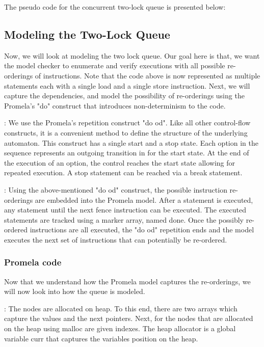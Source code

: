 The pseudo code for the concurrent two-lock queue is presented below:



\subsection{Modeling the Two-Lock Queue}

Now, we will look at modeling the two lock queue. Our goal here is that,
we want the model checker to enumerate and verify executions with all possible
re-orderings of instructions. Note that the code above is now represented as multiple
statements each with a single load and a single store instruction. Next, we will capture
the dependencies, and model the possibility of re-orderings using the Promela's "do"
construct that introduces non-determinism to the code.

: We use the Promela's repetition construct "do od". Like all
other control-flow constructs, it is a convenient method to define the structure of the
underlying automaton. This construct has a single start and a stop state. Each option in
the sequence represents an outgoing transition in for the start state. At the end of the
execution of an option, the control reaches the start state allowing for repeated execution.
A stop statement can be reached via a break statement.

: Using the above-mentioned "do od" construct, the
possible instruction re-orderings are embedded into the Promela model. After a statement
is executed, any statement until the next fence instruction can be executed. The executed
statements are tracked using a marker array, named done. Once the possibly re-ordered
instructions are all executed, the "do od" repetition ends and the model executes the next
set of instructions that can potentially be re-ordered.

\subsubsection{Promela code}
Now that we understand how the Promela model captures the re-orderings, we will now look
into how the queue is modeled. 

: The nodes are allocated on heap. To this end, there
are two arrays which capture the values and the next pointers. Next, for the nodes that
are allocated on the heap using malloc are given indexes. The heap allocator is a global
variable curr that captures the variables position on the heap.

